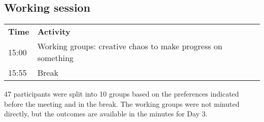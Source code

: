 \subsection{Working session}

\begin{table}[!h]
    \centering
    \begin{tabular}{@{}|p{}|p{}|@{}}
    \rowcolor{Task32Blue2} \textbf{Time} & \textbf{Activity} \\    
    15:00 & Working groups: creative chaos to make progress on something \\
    15:55 & Break
    \end{tabular}
    \label{tab:day2-workingsession-agenda}
\end{table}

47 participants were split into 10 groups based on the preferences indicated before the meeting and in the break. The working groups were not minuted directly, but the outcomes are available in the minutes for Day 3.
